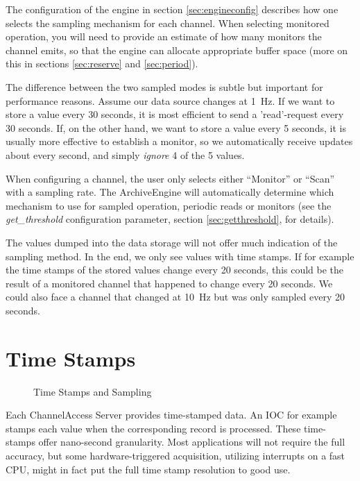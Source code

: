 \noindent The configuration of the engine in section
\ref{sec:engineconfig} describes how one selects the sampling
mechanism for each channel. 
When selecting monitored operation, you will need to provide an
estimate of how many monitors the channel emits, so that the engine
can allocate appropriate buffer space (more on this in sections
\ref{sec:reserve} and \ref{sec:period}).

The difference between the two sampled modes is subtle but important
for performance reasons. Assume our data source changes at 1~Hz. If
we want to store a value every 30 seconds, it is most efficient to
send a 'read'-request every 30 seconds. If, on the other hand, we want
to store a value every 5 seconds, it is usually more effective to
establish a monitor, so we automatically receive updates about every
second, and simply \emph{ignore} 4 of the 5 values.

When configuring a channel, the user only selects either ``Monitor''
or ``Scan'' with a sampling rate.  The ArchiveEngine will
automatically determine which mechanism to use for sampled operation,
periodic reads or monitors (see the \emph{get\_threshold} configuration
parameter, section \ref{sec:getthreshold}, for details).

\NOTE The values dumped into the data storage will not offer much
indication of the sampling method. In the end, we only see values with
time stamps. If for example the time stamps of the stored values
change every 20 seconds, this could be the result of a monitored
channel that happened to change every 20 seconds. We could also face a
channel that changed at 10~Hz but was only sampled every 20 seconds. 

\section{Time Stamps}
\begin{figure}[htb]
\begin{center}
\end{center}
\caption{\label{fig:times}Time Stamps and Sampling}
\end{figure}

\noindent Each ChannelAccess Server provides time-stamped data. An IOC for
example stamps each value when the corresponding record is
processed.  These time-stamps offer nano-second granularity. Most
applications will not require the full accuracy, but some
hardware-triggered acquisition, utilizing interrupts on a fast CPU,
might in fact put the full time stamp resolution to good use.

